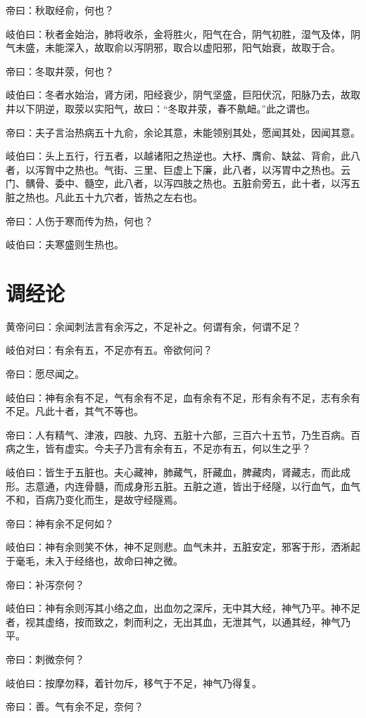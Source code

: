 \documentclass{article}%
\begin{document}
帝曰：秋取经俞，何也？

岐伯曰：秋者金始治，肺将收杀，金将胜火，阳气在合，阴气初胜，湿气及体，阴气未盛，未能深入，故取俞以泻阴邪，取合以虚阳邪，阳气始衰，故取于合。

帝曰：冬取井荥，何也？

岐伯曰：冬者水始治，肾方闭，阳经衰少，阴气坚盛，巨阳伏沉，阳脉乃去，故取井以下阴逆，取荥以实阳气，故曰：“冬取井荥，春不鼽衄。”此之谓也。

帝曰：夫子言治热病五十九俞，余论其意，未能领别其处，愿闻其处，因闻其意。

岐伯曰：头上五行，行五者，以越诸阳之热逆也。大杼、膺俞、缺盆、背俞，此八者，以泻胷中之热也。气街、三里、巨虚上下廉，此八者，以泻胃中之热也。云门、髃骨、委中、髓空，此八者，以泻四肢之热也。五脏俞旁五，此十者，以泻五脏之热也。凡此五十九穴者，皆热之左右也。

帝曰：人伤于寒而传为热，何也？

岐伯曰：夫寒盛则生热也。
\section{调经论}
黄帝问曰：余闻刺法言有余泻之，不足补之。何谓有余，何谓不足？

岐伯对曰：有余有五，不足亦有五。帝欲何问？

帝曰：愿尽闻之。

岐伯曰：神有余有不足，气有余有不足，血有余有不足，形有余有不足，志有余有不足。凡此十者，其气不等也。

帝曰：人有精气、津液，四肢、九窍、五脏十六部，三百六十五节，乃生百病。百病之生，皆有虚实。今夫子乃言有余有五，不足亦有五，何以生之乎？

岐伯曰：皆生于五脏也。夫心藏神，肺藏气，肝藏血，脾藏肉，肾藏志，而此成形。志意通，内连骨髓，而成身形五脏。五脏之道，皆出于经隧，以行血气，血气不和，百病乃变化而生，是故守经隧焉。

帝曰：神有余不足何如？

岐伯曰：神有余则笑不休，神不足则悲。血气未并，五脏安定，邪客于形，洒淅起于毫毛，未入于经络也，故命曰神之微。

帝曰：补泻奈何？

岐伯曰：神有余则泻其小络之血，出血勿之深斥，无中其大经，神气乃平。神不足者，视其虚络，按而致之，刺而利之，无出其血，无泄其气，以通其经，神气乃平。

帝曰：刺微奈何？

岐伯曰：按摩勿释，着针勿斥，移气于不足，神气乃得复。

帝曰：善。气有余不足，奈何？
\end{document}
